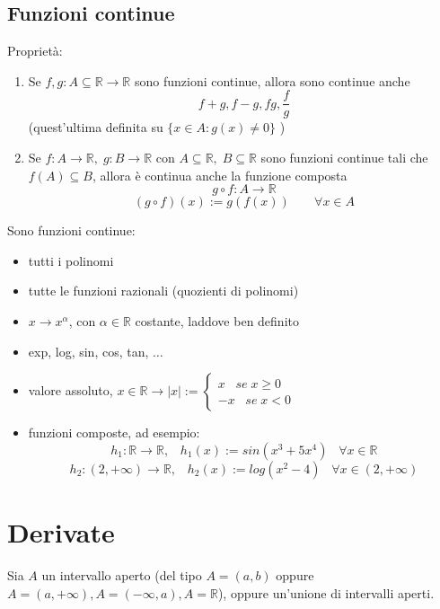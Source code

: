 \documentclass[a4paper]{article}
\theoremstyle{break}
\theoremstyle{break}
\theoremstyle{break}
\theoremstyle{break}
\begin{document}
\subsection{Funzioni continue}

Proprietà:
\begin{enumerate}
	\item Se \( f,g: A \subseteq \mathbb{R} \to  \mathbb{R} \) sono funzioni continue, allora sono continue anche
	      \[
		      f+g, f-g, fg, \frac{f}{g}
	      \]
	      (quest'ultima definita su \( \{x \in A: g(x) \neq 0\}  \) )
	\item Se \( f: A \to \mathbb{R},\;g: B \to \mathbb{R} \) con \( A \subseteq \mathbb{R},\; B \subseteq \mathbb{R} \)
	      sono funzioni continue tali che \( f(A) \subseteq B \), allora è continua anche la funzione composta
	      \[
		      g \circ f: A \to \mathbb{R}
	      \]
	      \[
		      (g \circ f)(x) := g(f(x))\;\;\;\;\;\;\; \forall x \in A
	      \]
\end{enumerate}
\begin{example}
	Sono funzioni continue:
	\begin{itemize}
		\item tutti i polinomi
		\item tutte le funzioni razionali (quozienti di polinomi)
		\item \( x \to x^\alpha \), con \( \alpha \in \mathbb{R} \) costante, laddove ben definito
		\item exp, log, sin, cos, tan, \( \ldots \)
		\item valore assoluto, \( x \in \mathbb{R} \to |x|:= \begin{cases}
			      x\;\;\; se\; x \ge 0 \\
			      -x\;\;\; se\; x < 0
		      \end{cases} \)
		\item funzioni composte, ad esempio:
		      \[
			      h_1: \mathbb{R} \to \mathbb{R},\;\;\; h_1(x):=sin(x^3 + 5x^4)\;\;\; \forall x \in \mathbb{R}
		      \]
		      \[
			      h_2:(2, +\infty) \to \mathbb{R}, \;\;\; h_2(x):=log(x^2-4)\;\;\; \forall x \in (2, +\infty)
		      \]
	\end{itemize}
\end{example}

\section{Derivate}
Sia \( A \) un intervallo aperto (del tipo \( A=(a,b) \) oppure \( A=(a,+\infty), A=(-\infty, a), A=\mathbb{R} \)),
oppure un'unione di intervalli aperti.
\end{document}
